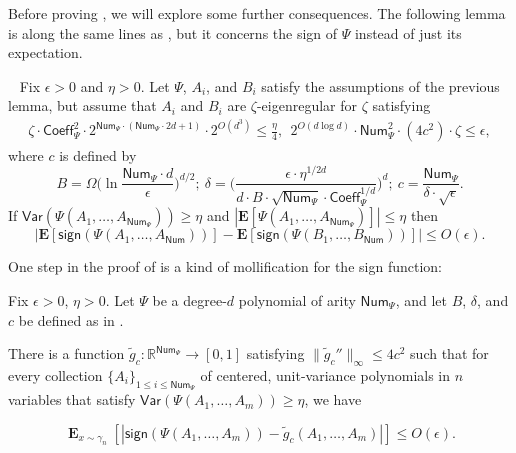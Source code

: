 \documentclass{toc}
\begin{document}
Before proving , we will explore some further consequences.
The following lemma is along the same lines as ,
but it concerns the sign of $\Psi$ instead of just its expectation.

\begin{lemma}~\label{lem:sign-match}
    Fix $\epsilon > 0$ and $\eta > 0$.
    Let $\Psi$, $A_i$, and $B_i$ satisfy the assumptions of the previous lemma, but
    assume that $A_i$ and $B_i$ are $\zeta$-eigenregular for $\zeta$ satisfying
    \begin{eqnarray*}
    \zeta \cdot \mathsf{Coeff}^2_\Psi \cdot 2^{\mathsf{Num}_\Psi \cdot (\mathsf{Num}_\Psi \cdot 2d+1)} \cdot 2^{O(d^3)} \leq \frac{\eta}{4} , \ \ 
     2^{O(d \log d)} \cdot \mathsf{Num}_{\Psi}^2 \cdot (4c^2) \cdot \zeta \le \epsilon,
    \end{eqnarray*}
    where $c$ is defined by
    \[
    B = \Omega\bigg( \ln  \frac{\mathsf{Num}_\Psi \cdot d}{\epsilon} \bigg)^{d/2} ;  \ \delta = \bigg( \frac{\epsilon \cdot \eta^{1/2d}}{d \cdot B \cdot \sqrt{\mathsf{Num}_\Psi} \cdot \mathsf{Coeff}_\Psi^{1/d}} \bigg)^d; \   c = \frac{\mathsf{Num}_{\Psi}}{\delta \cdot \sqrt{\epsilon}}.
    \]
    If $\mathsf{Var}(\Psi(A_1, \ldots,
    A_{\mathsf{Num}_\Psi})) \ge \eta$ and $|\mathbf{E}[\Psi(A_1, \ldots,
    A_{\mathsf{Num}_\Psi})]| \le \eta$ then
    \[
        |\mathbf{E}[\mathsf{sign}(\Psi(A_1, \ldots, A_{\mathsf{Num}}))] - \mathbf{E}[\mathsf{sign}(\Psi(B_1, \ldots, B_{\mathsf{Num}}))]| \le O(\epsilon).
    \]
\end{lemma}

One step in the proof of  is a kind of mollification for the sign function:

\begin{lemma}\label{lem:mollification}
    Fix $\epsilon > 0$, $\eta > 0$. Let $\Psi$ be a degree-$d$ polynomial of
    arity $\mathsf{Num}_\Psi$, and
    let $B$, $\delta$, and $c$ be defined as in .

    There is a function $\tilde{g}_c: \mathbb{R}^{\mathsf{Num}_\Psi}
    \rightarrow [0,1]$ satisfying $\|\tilde g_c''\|_\infty \le 4 c^2$ such that
    for every collection $\{A_i\}_{1 \le i \le \mathsf{Num}_\Psi}$ of centered,
    unit-variance polynomials in $n$ variables that satisfy
    $\mathsf{Var}(\Psi(A_1, \ldots, A_m)) \ge \eta$, we have

\[
\mathop{\mathbf{E}}_{x \sim \gamma_n} [|\mathsf{sign}(\Psi(A_1, \ldots, A_m)) - \tilde{g}_c(A_1, \ldots, A_m)|] \le O(\epsilon). 
\]
\end{lemma}
\end{document}
